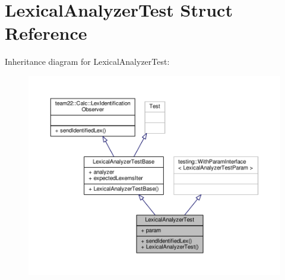 \hypertarget{struct_lexical_analyzer_test}{}\section{Lexical\+Analyzer\+Test Struct Reference}
\label{struct_lexical_analyzer_test}


Inheritance diagram for Lexical\+Analyzer\+Test\+:
\nopagebreak
\begin{figure}[H]
\begin{center}
\leavevmode
\includegraphics[width=350pt]{struct_lexical_analyzer_test__inherit__graph}
\end{center}
\end{figure}



